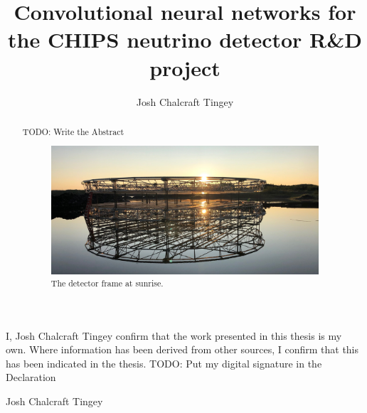 
\title{Convolutional neural networks for the CHIPS neutrino detector R\&D project}
\author{Josh Chalcraft Tingey}

\thispagestyle{plain}

\begin{declaration} %
    I, Josh Chalcraft Tingey confirm that the work presented in this thesis is my own. Where
    information has been derived from other sources, I confirm that this has been indicated in the
    thesis.
    TODO: Put my digital signature in the Declaration
    \vspace*{1cm}
    \begin{flushright}
        Josh Chalcraft Tingey
    \end{flushright}
\end{declaration}

\begin{abstract} %
    TODO: Write the Abstract

    \begin{figure} %
        \includegraphics[width=\textwidth]{diagrams/4-chips/sunrise.pdf}
        \caption*{The \chipsfive detector frame at sunrise.}
    \end{figure}

\end{abstract}


